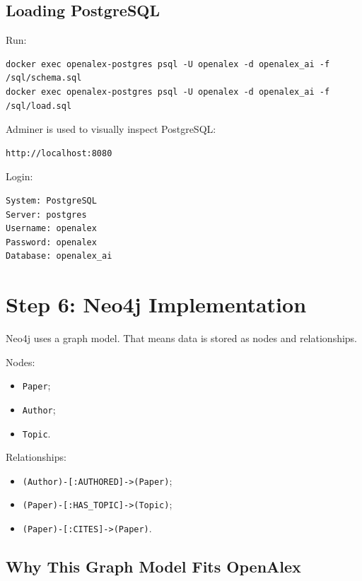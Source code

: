 \documentclass[11pt]{article}
\begin{document}
\subsection{Loading PostgreSQL}

Run:

\begin{verbatim}
docker exec openalex-postgres psql -U openalex -d openalex_ai -f /sql/schema.sql
docker exec openalex-postgres psql -U openalex -d openalex_ai -f /sql/load.sql
\end{verbatim}

Adminer is used to visually inspect PostgreSQL:

\begin{verbatim}
http://localhost:8080
\end{verbatim}

Login:

\begin{verbatim}
System: PostgreSQL
Server: postgres
Username: openalex
Password: openalex
Database: openalex_ai
\end{verbatim}

\section{Step 6: Neo4j Implementation}

Neo4j uses a graph model.
That means data is stored as nodes and relationships.

Nodes:

\begin{itemize}
    \item \texttt{Paper};
    \item \texttt{Author};
    \item \texttt{Topic}.
\end{itemize}

Relationships:

\begin{itemize}
    \item \texttt{(Author)-[:AUTHORED]->(Paper)};
    \item \texttt{(Paper)-[:HAS\_TOPIC]->(Topic)};
    \item \texttt{(Paper)-[:CITES]->(Paper)}.
\end{itemize}

\subsection{Why This Graph Model Fits OpenAlex}
\end{document}
